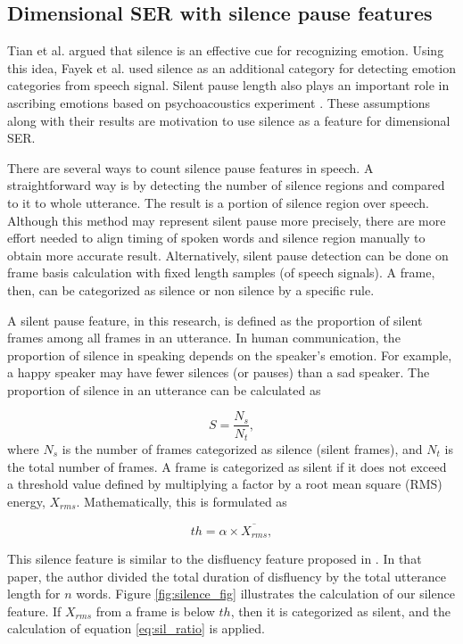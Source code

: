\subsection{Dimensional SER with silence pause features}
Tian et al. \cite{Tian2015a} argued that silence is an effective cue for
recognizing emotion.  Using this idea, Fayek et al. used silence as an
additional category for detecting emotion categories from speech signal. Silent
pause length also plays an important role in ascribing emotions based on
psychoacoustics experiment \cite{Tisljar-Szabo2014}. These assumptions along
with their results are motivation to use silence as a feature for dimensional
SER.

There are several ways to count silence pause features in speech. A
straightforward way is by detecting the number of silence regions and compared
to it to whole utterance. The result is a portion of silence region over
speech. Although this method may represent silent pause more precisely, there
are more effort needed to align timing of spoken words and silence region
manually to obtain more accurate result. Alternatively, silent pause detection
can be done on frame basis calculation with fixed length samples (of speech
signals). A frame, then, can be categorized as silence or non silence by a
specific rule.

A silent pause feature, in this research, is defined as the proportion of
silent frames among all frames in an utterance. In human communication, the
proportion of silence in speaking depends on the speaker's emotion. For
example, a happy speaker may have fewer silences (or pauses) than a sad
speaker. The proportion of silence in an utterance can be calculated as

\begin{equation}
  \label{eq:sil_ratio}
  S = \frac{N_{s}}{N_{t}},
\end{equation}
where $N_s$ is the number of frames categorized as silence (silent frames), and
$N_t$ is the total number of frames. A frame is categorized as silent if it does
not exceed a threshold value defined by multiplying a factor by a root mean
square (RMS) energy, $X_{rms}$. Mathematically, this is formulated as

\begin{equation}
 th = \alpha \times \overline{X_{rms}},
\end{equation}

This silence feature is similar to the disfluency feature proposed in
\cite{moore2014word}. In that paper, the author divided the total duration of
disfluency by the total utterance length for $n$ words. Figure
\ref{fig:silence_fig} illustrates the calculation of our silence feature. If
$X_{rms}$ from a frame is below $th$, then it is categorized as silent, and the
calculation of equation \ref{eq:sil_ratio} is applied.

